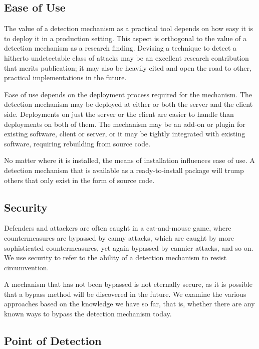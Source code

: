 \documentclass[10pt,journal,compsoc]{IEEEtran}
\begin{document}
\subsection{Ease of Use}
\label{sec:deployment}

The value of a detection mechanism as a practical tool depends on how
easy it is to deploy it in a production setting. This aspect is
orthogonal to the
value of a detection mechanism as a research finding. Devising a
technique to detect a hitherto undetectable class of attacks may be an
excellent research contribution that merits publication; it may also
be heavily cited and open the road to other, practical
implementations in the future. 

Ease of use depends on the deployment process required for the
mechanism. The detection mechanism may be deployed at either or both
the server and the client side. Deployments on just the server or the client are
easier to handle than deployments on both of them. The mechanism may
be an add-on or plugin for existing software, client or server, or it
may be tightly integrated with existing software, requiring rebuilding
from source code.

No matter where it is installed, the means of installation influences
ease of use. A detection mechanism that is available as a ready-to-install
package will trump others that only exist in the form
of source code. 

\subsection{Security}

Defenders and attackers are often caught in a cat-and-mouse game,
where countermeasures are bypassed by canny attacks, which are caught
by more sophisticated countermeasures, yet again bypassed by cannier
attacks, and so on. We use security to refer to the ability of a
detection mechanism to resist circumvention. 

A mechanism that has not been bypassed is not eternally secure, as it
is possible that a bypass method will be discovered in the future. We
examine the various approaches based on the knowledge we have so far,
that is, whether there are any known ways to bypass the detection
mechanism today.

\subsection{Point of Detection}
\label{sec:point}
\end{document}
